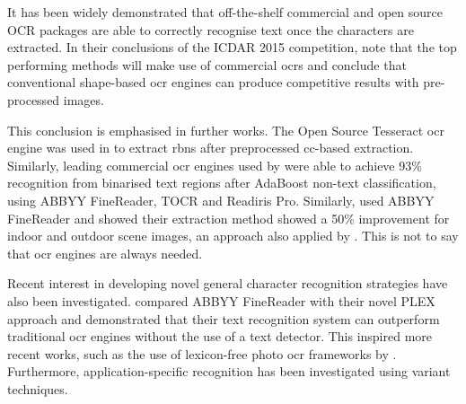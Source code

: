 It has been widely demonstrated that off-the-shelf commercial and open source OCR packages are able to correctly recognise text once the characters are extracted. In their conclusions of the ICDAR 2015 competition, \citeauthor{Karatzas:2015tj} note that the top performing methods will make use of commercial \glspl{ocr} and conclude that conventional shape-based \gls{ocr} engines can produce competitive results with pre-processed images. 

This conclusion is emphasised in further works. The Open Source Tesseract \gls{ocr} engine was used in \citet{Benami:2012jf} to extract \glspl{rbn} after preprocessed \gls{cc}-based extraction. Similarly, leading commercial \gls{ocr} engines used by \citet{XiangrongChen:2004ha} were able to achieve 93\% recognition from binarised text regions after AdaBoost non-text classification, using ABBYY FineReader, TOCR and Readiris Pro. Similarly, \citet{Gatos:2005wd} used ABBYY FineReader and showed their extraction method showed a 50\% improvement for indoor and outdoor scene images, an approach also applied by \citet{XiangrongChen:2004ha}. This is not to say that \gls{ocr} engines are always needed.

Recent interest in developing novel general character recognition strategies have also been investigated. \citet{Wang:2011tw} compared ABBYY FineReader with their novel PLEX approach and demonstrated that their text recognition system can outperform traditional \gls{ocr} engines without the use of a text detector. This inspired more recent works, such as the use of lexicon-free photo \gls{ocr} frameworks by \citep{Lee:2016uy}. Furthermore, application-specific recognition has been investigated using variant techniques.


